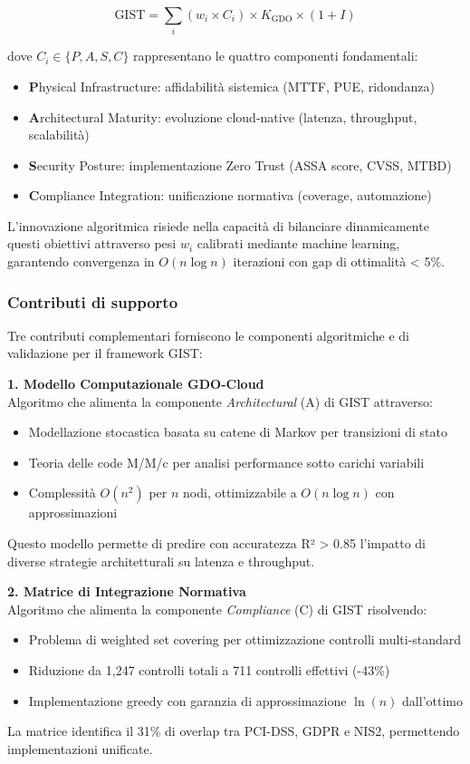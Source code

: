 \documentclass[12pt,a4paper,oneside]{book}
\numberwithin{figure}{chapter} %
\numberwithin{table}{chapter}  %
\begin{document}
\begin{equation}
\text{GIST} = \sum_{i} (w_i \times C_i) \times K_{\text{GDO}} \times (1 + I)
\end{equation}

dove $C_i \in \{P, A, S, C\}$ rappresentano le quattro componenti fondamentali:
\begin{itemize}
    \item \textbf{P}hysical Infrastructure: affidabilità sistemica (MTTF, PUE, ridondanza)
    \item \textbf{A}rchitectural Maturity: evoluzione cloud-native (latenza, throughput, scalabilità)
    \item \textbf{S}ecurity Posture: implementazione Zero Trust (ASSA score, CVSS, MTBD)
    \item \textbf{C}ompliance Integration: unificazione normativa (coverage, automazione)
\end{itemize}

L'innovazione algoritmica risiede nella capacità di bilanciare dinamicamente questi obiettivi attraverso pesi $w_i$ calibrati mediante machine learning, garantendo convergenza in $O(n \log n)$ iterazioni con gap di ottimalità < 5\%.
\subsubsection{\texorpdfstring{\textbf{Contributi di supporto}}{1.3.3.2 Contributo di supporto}}\label{contributi-supporto}

Tre contributi complementari forniscono le componenti algoritmiche e di validazione per il framework GIST:

\textbf{1. Modello Computazionale GDO-Cloud} \\
Algoritmo che alimenta la componente \textit{Architectural} (A) di GIST attraverso:
\begin{itemize}
    \item Modellazione stocastica basata su catene di Markov per transizioni di stato
    \item Teoria delle code M/M/c per analisi performance sotto carichi variabili
    \item Complessità $O(n^2)$ per $n$ nodi, ottimizzabile a $O(n \log n)$ con approssimazioni
\end{itemize}
Questo modello permette di predire con accuratezza R² > 0.85 l'impatto di diverse strategie architetturali su latenza e throughput.

\textbf{2. Matrice di Integrazione Normativa} \\
Algoritmo che alimenta la componente \textit{Compliance} (C) di GIST risolvendo:
\begin{itemize}
    \item Problema di weighted set covering per ottimizzazione controlli multi-standard
    \item Riduzione da 1,247 controlli totali a 711 controlli effettivi (-43\%)
    \item Implementazione greedy con garanzia di approssimazione $\ln(n)$ dall'ottimo
\end{itemize}
La matrice identifica il 31\% di overlap tra PCI-DSS, GDPR e NIS2, permettendo implementazioni unificate.
\end{document}
